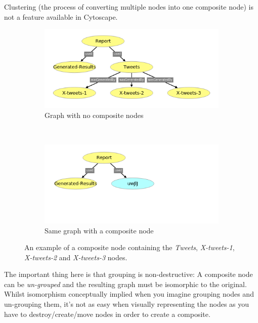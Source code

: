\documentclass[BIT, graphvis, a4paper]{usydthesis}
\begin{document}
Clustering (the process of converting multiple nodes into one composite node) is not a feature available in Cytoscape.

\begin{figure}[h]
  \centering
  \begin{subfigure}[b]{0.5\textwidth}
    \includegraphics[width=\textwidth]{ungrouped}
    \caption{Graph with no composite nodes}
  \end{subfigure}
  ~
  \begin{subfigure}[b]{0.5\textwidth}
    \includegraphics[width=\textwidth]{grouped}
    \caption{Same graph with a composite node}
  \end{subfigure}
\caption{An example of a composite node containing the \textit{Tweets}, \textit{X-tweets-1}, \textit{X-tweets-2} and \textit{X-tweets-3} nodes.}
\end{figure}

The important thing here is that grouping is non-destructive: A composite node can be \textit{un-grouped} and the resulting graph must be isomorphic to the original. Whilst isomorphism conceptually implied when you imagine grouping nodes and un-grouping them, it's not as easy when visually representing the nodes as you have to destroy/create/move nodes in order to create a composite.





\end{document}
